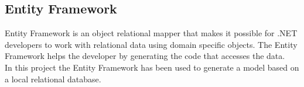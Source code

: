 \subsection{Entity Framework}
Entity Framework is an object relational mapper that makes it possible for .NET developers to work with relational data using domain specific objects.
The Entity Framework helps the developer by generating the code that accesses the data.
\cite{entity_framework}
\\
In this project the Entity Framework has been used to generate a model based on a local relational database.